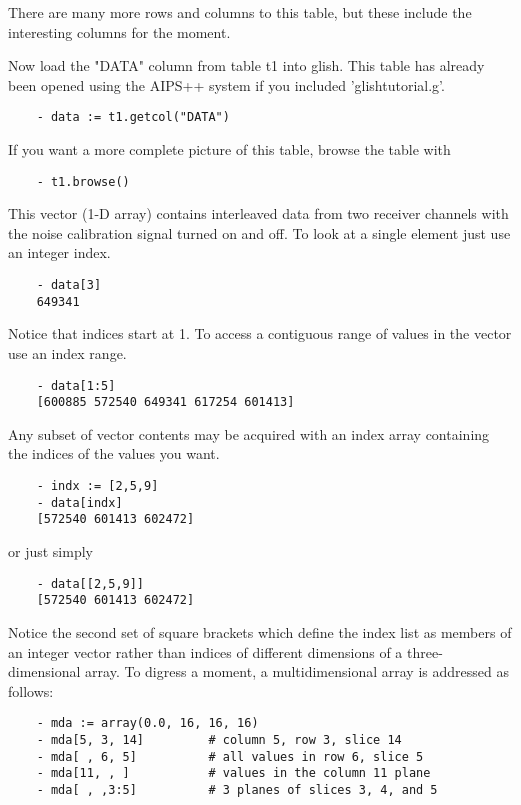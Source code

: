 There are many more rows and columns to this table, but these include the
interesting columns for the moment.

Now load the "DATA" column from table t1 into glish.  This table has
already been opened using the AIPS++  system if
you included 'glishtutorial.g'.

\begin{verbatim}
	- data := t1.getcol("DATA")
\end{verbatim}

If you want a more complete picture of this table, browse the table
with

\begin{verbatim}
	- t1.browse()
\end{verbatim}

This vector (1-D array) contains interleaved data from two receiver channels
with the noise calibration signal turned on and off.  To look at a single
element just use an integer index.

\begin{verbatim}
	- data[3]
	649341 
\end{verbatim}

Notice that indices start at 1.  To access a contiguous range of values in
the vector use an index range.

\begin{verbatim}
	- data[1:5]
	[600885 572540 649341 617254 601413]
\end{verbatim}

Any subset of vector contents may be acquired with an index array containing
the indices of the values you want.

\begin{verbatim}
	- indx := [2,5,9]
	- data[indx]
	[572540 601413 602472]
\end{verbatim}

or just simply

\begin{verbatim}
	- data[[2,5,9]]
	[572540 601413 602472]
\end{verbatim}

Notice the second set of square brackets which define the index list as
members of an integer vector rather than indices of different dimensions of
a three-dimensional array.  To digress a moment, a multidimensional array
is addressed as follows:

\begin{verbatim}
	- mda := array(0.0, 16, 16, 16)
	- mda[5, 3, 14]			# column 5, row 3, slice 14
	- mda[ , 6, 5]			# all values in row 6, slice 5
	- mda[11, , ]			# values in the column 11 plane
	- mda[ , ,3:5]			# 3 planes of slices 3, 4, and 5
\end{verbatim}

